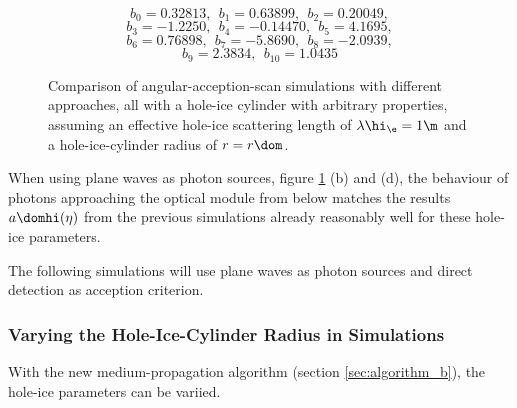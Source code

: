 $$ b_0 = 0.32813, \ \ b_1 = 0.63899, \ \ b_2 = 0.20049, $$
$$ b_3 = -1.2250, \ \ b_4 = -0.14470, \ \ b_5 = 4.1695, $$
$$ b_6 = 0.76898, \ \ b_7 = -5.8690, \ \ b_8 = -2.0939, $$
$$ b_9 = 2.3834, \ \ b_{10} = 1.0435 $$

\begin{figure}[htbp]
  \hfill
  \hfill
  \hfill
  \hfill
  \caption{Comparison of angular-acception-scan simulations with different approaches, all with a hole-ice cylinder with arbitrary properties, assuming an effective hole-ice scattering length of $\lambda\hi_\e=1\m$ and a hole-ice-cylinder radius of $r=r\dom$.}
  \label{fig:eVapie9t}
\end{figure}

When using plane waves as photon sources, figure \ref{fig:eVapie9t} (b) and (d), the behaviour of photons approaching the optical module from below matches the results $a\domhi(\eta)$ from the previous simulations \cite{icepaper} already reasonably well for these hole-ice parameters.

The following simulations will use plane waves as photon sources and direct detection as acception criterion.



\subsubsection{Varying the Hole-Ice-Cylinder Radius in Simulations}
With the new medium-propagation algorithm (section \ref{sec:algorithm_b}), the hole-ice parameters can be variied.


